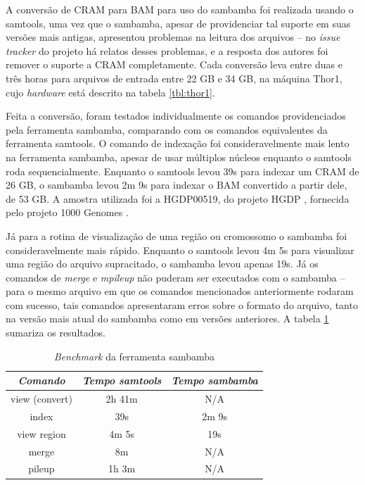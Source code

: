 \documentclass[cic,tc]{iiufrgs}
\begin{document}
A conversão de CRAM para BAM para uso do sambamba foi realizada usando o
samtools, uma vez que o sambamba, apesar de providenciar tal suporte em suas
versões mais antigas, apresentou problemas na leitura dos arquivos -- no
\textit{issue tracker} do projeto há relatos desses problemas, e a resposta dos
autores foi remover o suporte a CRAM completamente. Cada conversão leva entre
duas e três horas para arquivos de entrada entre 22 GB e 34 GB, na máquina
Thor1, cujo \textit{hardware} está descrito na tabela \ref{tbl:thor1}.

Feita a conversão, foram testados individualmente os comandos providenciados
pela ferramenta sambamba, comparando com os comandos equivalentes da ferramenta
samtools. O comando de indexação foi consideravelmente mais lento na ferramenta
sambamba, apesar de usar múltiplos núcleos enquanto o samtools roda
sequencialmente. Enquanto o samtools levou 39s para indexar um CRAM de 26 GB, o
sambamba levou 2m 9s para indexar o BAM convertido a partir dele, de 53 GB. A
amostra utilizada foi a HGDP00519, do projeto HGDP \cite{cavalli2005human},
fornecida pelo projeto 1000 Genomes \cite{via20101000}.

Já para a rotina de visualização de uma região ou cromossomo o sambamba foi
consideravelmente mais rápido. Enquanto o samtools levou 4m 5s para visualizar
uma região do arquivo supracitado, o sambamba levou apenas 19s. Já os comandos
de \textit{merge} e \textit{mpileup} não puderam ser executados com o sambamba
-- para o mesmo arquivo em que os comandos mencionados anteriormente rodaram
com sucesso, tais comandos apresentaram erros sobre o formato do arquivo, tanto
na versão mais atual do sambamba como em versões anteriores. A tabela
\ref{tbl:sambamba} sumariza os resultados.

\begin{table}[h]
  \caption{\textit{Benchmark} da ferramenta sambamba}
    \centering
        \begin{tabular}{c|c|c}
          \hline
          \textit{Comando}  &   \textit{Tempo samtools}  & \textit{Tempo sambamba} \\
          \hline
          \hline
          view (convert) & 2h 41m & N/A \\
          index & 39s & 2m 9s \\
          view region & 4m 5s & 19s \\
          merge & 8m & N/A \\
          pileup & 1h 3m & N/A \\
          \hline
        \end{tabular}
    \label{tbl:sambamba}
\end{table}
\end{document}
